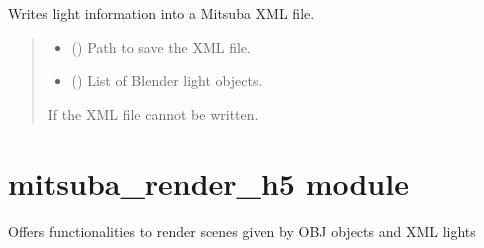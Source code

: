 \documentclass[letterpaper,10pt,english]{sphinxmanual}
\begin{document}

\begin{fulllineitems}
\label{\detokenize{blender_export:blender_export.write_mitsuba_xml}}
\pysigstartsignatures
\pysiglinewithargsret
{}
{\sphinxparamcomma {}}
{}
\pysigstopsignatures
\sphinxAtStartPar
Writes light information into a Mitsuba XML file.
\begin{quote}\begin{description}
\begin{itemize}
\item {} 
\sphinxAtStartPar
{} () \textendash{} Path to save the XML file.

\item {} 
\sphinxAtStartPar
{} () \textendash{} List of Blender light objects.

\end{itemize}

\sphinxAtStartPar
{} \textendash{} If the XML file cannot be written.

\end{description}\end{quote}

\end{fulllineitems}


\sphinxstepscope


\chapter{mitsuba\_render\_h5 module}
\label{\detokenize{mitsuba_render_h5:module-mitsuba_render_h5}}\label{\detokenize{mitsuba_render_h5:mitsuba-render-h5-module}}\label{\detokenize{mitsuba_render_h5::doc}}
\sphinxAtStartPar
Offers functionalities to render scenes given by OBJ objects and XML lights
\end{document}
